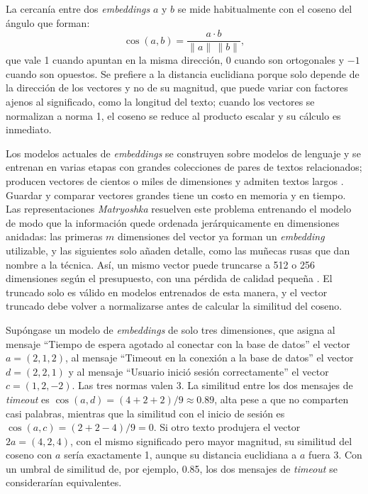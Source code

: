 La cercanía entre dos \textit{embeddings} $a$ y $b$ se mide habitualmente con el coseno del ángulo que forman:
\begin{equation}
\cos(a, b) = \frac{a \cdot b}{\lVert a \rVert \, \lVert b \rVert},
\end{equation}
que vale 1 cuando apuntan en la misma dirección, 0 cuando son ortogonales y $-1$ cuando son opuestos. Se prefiere a la distancia euclidiana porque solo depende de la dirección de los vectores y no de su magnitud, que puede variar con factores ajenos al significado, como la longitud del texto; cuando los vectores se normalizan a norma 1, el coseno se reduce al producto escalar y su cálculo es inmediato.

Los modelos actuales de \textit{embeddings} se construyen sobre modelos de lenguaje y se entrenan en varias etapas con grandes colecciones de pares de textos relacionados; producen vectores de cientos o miles de dimensiones y admiten textos largos \cite{zhang2025_qwen3emb}. Guardar y comparar vectores grandes tiene un costo en memoria y en tiempo. Las representaciones \textit{Matryoshka} resuelven este problema entrenando el modelo de modo que la información quede ordenada jerárquicamente en dimensiones anidadas: las primeras $m$ dimensiones del vector ya forman un \textit{embedding} utilizable, y las siguientes solo añaden detalle, como las muñecas rusas que dan nombre a la técnica. Así, un mismo vector puede truncarse a 512 o 256 dimensiones según el presupuesto, con una pérdida de calidad pequeña \cite{kusupati2022_matryoshka}. El truncado solo es válido en modelos entrenados de esta manera, y el vector truncado debe volver a normalizarse antes de calcular la similitud del coseno.

Supóngase un modelo de \textit{embeddings} de solo tres dimensiones, que asigna al mensaje ``Tiempo de espera agotado al conectar con la base de datos'' el vector $a = (2, 1, 2)$, al mensaje ``Timeout en la conexión a la base de datos'' el vector $d = (2, 2, 1)$ y al mensaje ``Usuario inició sesión correctamente'' el vector $c = (1, 2, -2)$. Las tres normas valen 3. La similitud entre los dos mensajes de \textit{timeout} es $\cos(a, d) = (4 + 2 + 2)/9 \approx 0.89$, alta pese a que no comparten casi palabras, mientras que la similitud con el inicio de sesión es $\cos(a, c) = (2 + 2 - 4)/9 = 0$. Si otro texto produjera el vector $2a = (4, 2, 4)$, con el mismo significado pero mayor magnitud, su similitud del coseno con $a$ sería exactamente 1, aunque su distancia euclidiana a $a$ fuera 3. Con un umbral de similitud de, por ejemplo, 0.85, los dos mensajes de \textit{timeout} se considerarían equivalentes.


